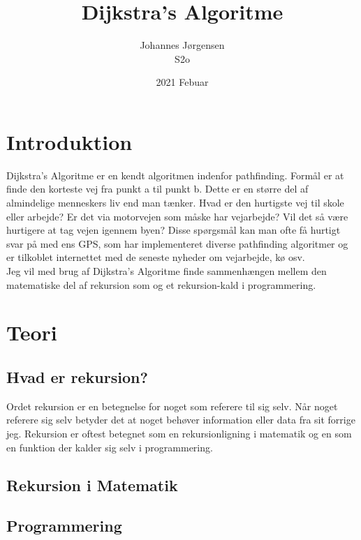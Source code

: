 \documentclass[12pt]{article}
\begin{document}
\title{Dijkstra's Algoritme}
\author{Johannes Jørgensen\\ S2o}
\date{2021 Febuar}
\maketitle
\pagebreak
\tableofcontents
\pagebreak

\section{Introduktion}
Dijkstra's Algoritme er en kendt algoritmen indenfor pathfinding. Formål er at finde den korteste vej fra punkt a til punkt b. Dette er en større del af almindelige menneskers liv end man tænker. Hvad er den hurtigste vej til skole eller arbejde? Er det via motorvejen som måske har vejarbejde? Vil det så være hurtigere at tag vejen igennem byen? Disse spørgsmål kan man ofte få hurtigt svar på med ens GPS, som har implementeret diverse pathfinding algoritmer og er tilkoblet internettet med de seneste nyheder om vejarbejde, kø osv. 
\\Jeg vil med brug af Dijkstra's Algoritme finde sammenhængen mellem den matematiske del af rekursion som og et rekursion-kald i programmering.  

\section{Teori}
\subsection{Hvad er rekursion?}
Ordet rekursion er en betegnelse for noget som referere til sig selv. Når noget referere sig selv betyder det at noget behøver information eller data fra sit forrige jeg. Rekursion er oftest betegnet som en rekursionligning i matematik og en som en funktion der kalder sig selv i programmering. 
\subsection{Rekursion i Matematik}
\subsection{Programmering}
\end{document}
